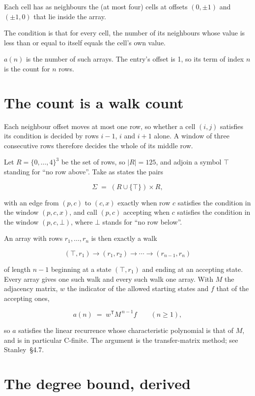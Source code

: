 \documentclass[11pt]{article}
\theoremstyle{definition}
\begin{document}
Each cell has as neighbours the (at most four) cells at offsets $(0,\pm1)$ and $(\pm1,0)$ that lie inside the array.

The condition is that for every cell, the number of its neighbours whose value is less than or equal to itself equals the cell's own value.

$a(n)$ is the number of such arrays. The entry's offset is 1, so its term of index $n$ is the count for $n$ rows.

\section{The count is a walk count}

Each neighbour offset moves at most one row, so whether a cell $(i,j)$ satisfies its condition is decided by rows $i-1$, $i$ and $i+1$ alone. A window of three consecutive rows therefore decides the whole of its middle row.

Let $R = \{0,\dots,4\}^{3}$ be the set of rows, so $|R| = 125$, and adjoin a symbol $\top$ standing for ``no row above''. Take as states the pairs

\[\Sigma \;=\; (R \cup \{\top\}) \times R,\]

with an edge from $(p,c)$ to $(c,x)$ exactly when row $c$ satisfies the condition in the window $(p,c,x)$, and call $(p,c)$ accepting when $c$ satisfies the condition in the window $(p,c,\bot)$, where $\bot$ stands for ``no row below''.

An array with rows $r_1,\dots,r_n$ is then exactly a walk

\[(\top,r_1) \to (r_1,r_2) \to \cdots \to (r_{n-1},r_n)\]

of length $n-1$ beginning at a state $(\top,r_1)$ and ending at an accepting state. Every array gives one such walk and every such walk one array. With $M$ the adjacency matrix, $w$ the indicator of the allowed starting states and $f$ that of the accepting ones,

\[a(n) \;=\; w^{\mathsf T} M^{\,n-1} f \qquad (n \ge 1),\]

so $a$ satisfies the linear recurrence whose characteristic polynomial is that of $M$, and is in particular C-finite. The argument is the transfer-matrix method; see Stanley~\S4.7.

\section{The degree bound, derived}
\end{document}
